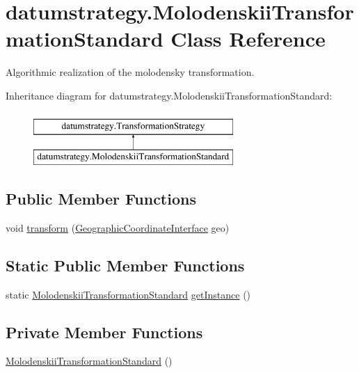 \hypertarget{classdatumstrategy_1_1_molodenskii_transformation_standard}{}\section{datumstrategy.\+Molodenskii\+Transformation\+Standard Class Reference}
\label{classdatumstrategy_1_1_molodenskii_transformation_standard}


Algorithmic realization of the molodensky transformation.  


Inheritance diagram for datumstrategy.\+Molodenskii\+Transformation\+Standard\+:\begin{figure}[H]
\begin{center}
\leavevmode
\includegraphics[height=2.000000cm]{classdatumstrategy_1_1_molodenskii_transformation_standard}
\end{center}
\end{figure}
\subsection*{Public Member Functions}
\begin{DoxyCompactItemize}
\item 
void \hyperlink{classdatumstrategy_1_1_molodenskii_transformation_standard_a8a1d2f121cb0484a0ba2ddee678d8276}{transform} (\hyperlink{classcoordinates_1_1_geographic_coordinate_interface}{Geographic\+Coordinate\+Interface} geo)
\end{DoxyCompactItemize}
\subsection*{Static Public Member Functions}
\begin{DoxyCompactItemize}
\item 
static \hyperlink{classdatumstrategy_1_1_molodenskii_transformation_standard}{Molodenskii\+Transformation\+Standard} \hyperlink{classdatumstrategy_1_1_molodenskii_transformation_standard_a09d8ecc0b04ffbfeb3b4ef4a6024e3f6}{get\+Instance} ()
\end{DoxyCompactItemize}
\subsection*{Private Member Functions}
\begin{DoxyCompactItemize}
\item 
\hyperlink{classdatumstrategy_1_1_molodenskii_transformation_standard_a57734f96ea69c6d385ce682a41427ac6}{Molodenskii\+Transformation\+Standard} ()
\end{DoxyCompactItemize}
